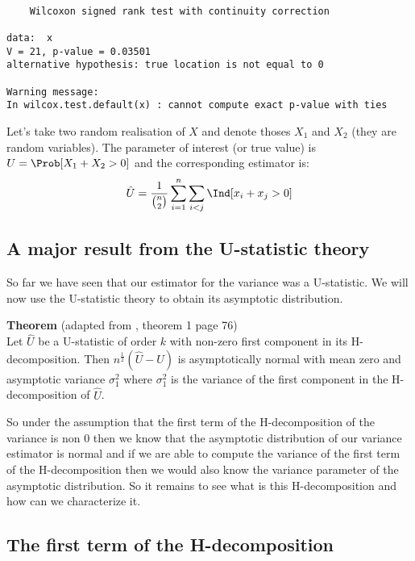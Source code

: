 \documentclass[12pt]{article}
\begin{document}
\begin{verbatim}

	Wilcoxon signed rank test with continuity correction

data:  x
V = 21, p-value = 0.03501
alternative hypothesis: true location is not equal to 0

Warning message:
In wilcox.test.default(x) : cannot compute exact p-value with ties
\end{verbatim}

Let's take two random realisation of \(X\) and denote thoses \(X_1\)
and \(X_2\) (they are random variables). The parameter of interest (or
true value) is \(U = \Prob[X_1+X_2>0]\) and the corresponding
estimator is:
\begin{align*}
\hat{U} = \frac{1}{{n \choose 2}} \sum_{i=1}^{n} \sum_{i<j} \Ind[x_i+x_j>0]
\end{align*}

\subsection{A major result from the U-statistic theory}
\label{sec:orgd19dfd3}

So far we have seen that our estimator for the variance was a
U-statistic. We will now use the U-statistic theory to obtain its
asymptotic distribution.

\bigskip

\textbf{Theorem} (adapted from \cite{lee1990u}, theorem 1 page 76) \\
 Let \(\hat{U}\) be a U-statistic of order \(k\) with non-zero first
 component in its H-decomposition. Then \(n^{\frac{1}{2}}
 (\hat{U}-U)\) is asymptotically normal with mean zero and asymptotic
 variance \(\sigma^2_1\) where \(\sigma^2_1\) is the variance of the
 first component in the H-decomposition of \(\hat{U}\).

\bigskip

So under the assumption that the first term of the H-decomposition of
the variance is non 0 then we know that the asymptotic distribution of
our variance estimator is normal and if we are able to compute the
variance of the first term of the H-decomposition then we would also
know the variance parameter of the asymptotic distribution. So it
remains to see what is this H-decomposition and how can we
characterize it.

\subsection{The first term of the H-decomposition}
\label{sec:org9676ff3}
\end{document}
